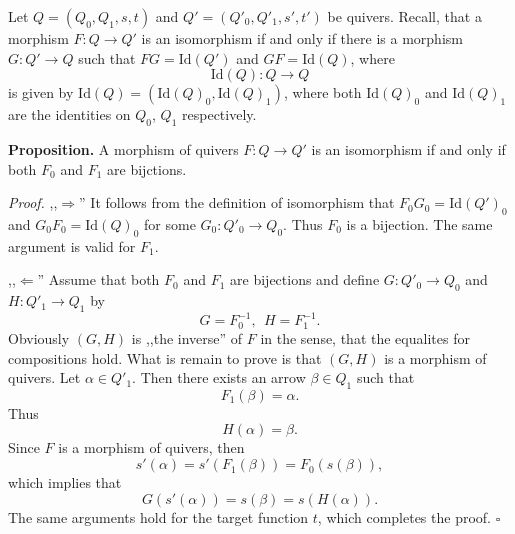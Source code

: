 \documentclass[12pt]{article}
\newcommand{\Id}{\mathrm{Id}}
\begin{document}
Let $Q=(Q_0,Q_1,s,t)$ and $Q'=(Q'_0,Q'_1,s',t')$ be quivers. Recall, that a morphism $F:Q\to Q'$ is an isomorphism if and only if there is a morphism $G:Q'\to Q$ such that $FG=\Id(Q')$ and $GF=\Id(Q)$, where
$$\Id(Q):Q\to Q$$
is given by $\Id(Q)=(\Id(Q)_0,\Id(Q)_1)$, where both $\Id(Q)_0$ and $\Id(Q)_1$ are the identities on $Q_0$, $Q_1$ respectively.

\textbf{Proposition.} A morphism of quivers $F:Q\to Q'$ is an isomorphism if and only if both $F_0$ and $F_1$ are bijctions.

\textit{Proof.} ,,$\Rightarrow$'' It follows from the definition of isomorphism that $F_0G_0=\Id(Q')_0$ and $G_0F_0=\Id(Q)_0$ for some $G_0:Q'_0\to Q_0$. Thus $F_0$ is a bijection. The same argument is valid for $F_1$.

,,$\Leftarrow$'' Assume that both $F_0$ and $F_1$ are bijections and define $G:Q'_0\to Q_0$ and $H:Q'_1\to Q_1$ by
$$G=F_0^{-1},\ \ H=F_1^{-1}.$$
Obviously $(G,H)$ is ,,the inverse'' of $F$ in the sense, that the equalites for compositions hold. What is remain to prove is that $(G,H)$ is a morphism of quivers. Let $\alpha\in Q'_1$. Then there exists an arrow $\beta\in Q_1$ such that
$$F_1(\beta)=\alpha.$$
Thus
$$H(\alpha)=\beta.$$
Since $F$ is a morphism of quivers, then
$$s'(\alpha)=s'(F_1(\beta))=F_0(s(\beta)),$$
which implies that
$$G(s'(\alpha))=s(\beta)=s(H(\alpha)).$$
The same arguments hold for the target function $t$, which completes the proof. $\square$
\end{document}
